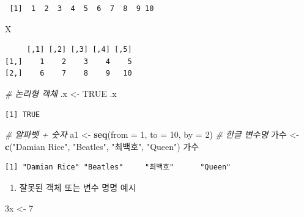 \documentclass[11pt,a4paper]{book}
\newenvironment{Shaded}{\begin{snugshade}}{\end{snugshade}}
\newcommand{\KeywordTok}[1]{\textcolor[rgb]{0.13,0.29,0.53}{\textbf{#1}}}
\newcommand{\DataTypeTok}[1]{\textcolor[rgb]{0.13,0.29,0.53}{#1}}
\newcommand{\DecValTok}[1]{\textcolor[rgb]{0.00,0.00,0.81}{#1}}
\newcommand{\StringTok}[1]{\textcolor[rgb]{0.31,0.60,0.02}{#1}}
\newcommand{\CommentTok}[1]{\textcolor[rgb]{0.56,0.35,0.01}{\textit{#1}}}
\newcommand{\OtherTok}[1]{\textcolor[rgb]{0.56,0.35,0.01}{#1}}
\newcommand{\NormalTok}[1]{#1}
\providecommand{\tightlist}{%
  \setlength{\itemsep}{0pt}\setlength{\parskip}{0pt}}
\theoremstyle{definition}
\theoremstyle{definition}
\theoremstyle{definition}
\theoremstyle{remark}
\begin{document}
\begin{verbatim}
 [1]  1  2  3  4  5  6  7  8  9 10
\end{verbatim}

\begin{Shaded}
\begin{Highlighting}[]
\NormalTok{X}
\end{Highlighting}
\end{Shaded}

\begin{verbatim}
     [,1] [,2] [,3] [,4] [,5]
[1,]    1    2    3    4    5
[2,]    6    7    8    9   10
\end{verbatim}

\begin{Shaded}
\begin{Highlighting}[]
\CommentTok{# 논리형 객체}
\NormalTok{.x <-}\StringTok{ }\OtherTok{TRUE}
\NormalTok{.x}
\end{Highlighting}
\end{Shaded}

\begin{verbatim}
[1] TRUE
\end{verbatim}

\begin{Shaded}
\begin{Highlighting}[]
\CommentTok{# 알파벳 + 숫자}
\NormalTok{a1 <-}\StringTok{ }\KeywordTok{seq}\NormalTok{(}\DataTypeTok{from =} \DecValTok{1}\NormalTok{, }\DataTypeTok{to =} \DecValTok{10}\NormalTok{, }\DataTypeTok{by =} \DecValTok{2}\NormalTok{)}
\CommentTok{# 한글 변수명}
\NormalTok{가수 <-}\StringTok{ }\KeywordTok{c}\NormalTok{(}\StringTok{"Damian Rice"}\NormalTok{, }\StringTok{"Beatles"}\NormalTok{, }\StringTok{"최백호"}\NormalTok{, }\StringTok{"Queen"}\NormalTok{)}
\NormalTok{가수}
\end{Highlighting}
\end{Shaded}

\begin{verbatim}
[1] "Damian Rice" "Beatles"     "최백호"      "Queen"      
\end{verbatim}

\normalsize

\begin{enumerate}
\def\labelenumi{\arabic{enumi}.}
\setcounter{enumi}{2}
\tightlist
\item
  잘못된 객체 또는 변수 명명 예시 \footnotesize
\end{enumerate}

\begin{Shaded}
\begin{Highlighting}[]
\NormalTok{3x <-}\StringTok{ }\DecValTok{7}
\end{Highlighting}
\end{Shaded}
\end{document}
